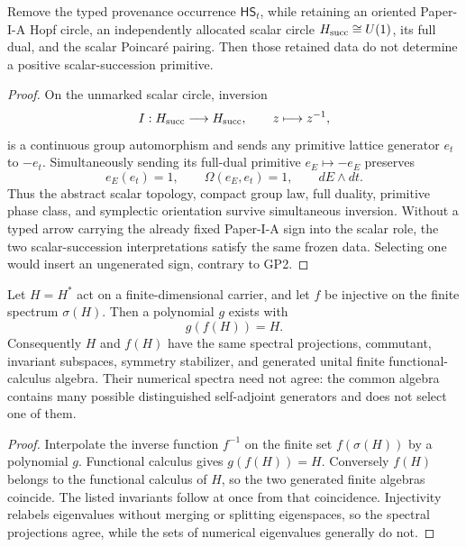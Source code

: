 \documentclass[11pt,a4paper]{article}
\begin{document}
\begin{proposition}
\label{p2:prop:scalar-orientation-inversion-countermodel}
Remove the typed provenance occurrence \(\mathsf{HS}_t\), while retaining an
oriented Paper-I-A Hopf circle, an independently allocated scalar circle
\(H_{\rm succ}\cong U(1)\), its full dual, and the scalar Poincar\'e pairing.
Then those retained data do not determine a positive scalar-succession
primitive.
\end{proposition}

\begin{proof}
On the unmarked scalar circle, inversion
\[
 I:H_{\rm succ}\longrightarrow H_{\rm succ},\qquad z\longmapsto z^{-1},
\]
is a continuous group automorphism and sends any primitive lattice generator
\(e_t\) to \(-e_t\).  Simultaneously sending its full-dual primitive
\(e_E\mapsto-e_E\) preserves
\[
 e_E(e_t)=1,
 \qquad
 \Omega(e_E,e_t)=1,
 \qquad
 dE\wedge dt.
\]
Thus the abstract scalar topology, compact group law, full duality, primitive
phase class, and symplectic orientation survive simultaneous inversion.
Without a typed arrow carrying the already fixed Paper-I-A sign into the scalar
role, the two scalar-succession interpretations satisfy the same frozen data.
Selecting one would insert an ungenerated sign, contrary to GP2.
\end{proof}


\begin{theorem}
\label{p2:thm:finite-spectral-reparametrization-no-go}
Let \(H=H^*\) act on a finite-dimensional carrier, and let \(f\) be injective
on the finite spectrum \(\sigma(H)\).  Then a polynomial \(g\) exists with
\[
        g(f(H))=H.
\]
Consequently \(H\) and \(f(H)\) have the same spectral projections,
commutant, invariant subspaces, symmetry stabilizer, and generated unital
finite functional-calculus algebra.  Their numerical spectra need not agree:
the common algebra contains many possible distinguished self-adjoint
generators and does not select one of them.
\end{theorem}

\begin{proof}
Interpolate the inverse function \(f^{-1}\) on the finite set
\(f(\sigma(H))\) by a polynomial \(g\).  Functional calculus gives
\(g(f(H))=H\).  Conversely \(f(H)\) belongs to the functional calculus of
\(H\), so the two generated finite algebras coincide.  The listed invariants
follow at once from that coincidence.  Injectivity relabels eigenvalues without
merging or splitting eigenspaces, so the spectral projections agree, while the
sets of numerical eigenvalues generally do not.
\end{proof}
\end{document}
